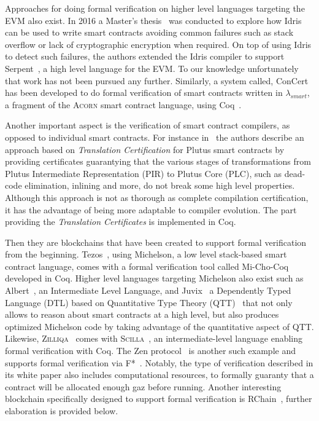 \documentclass[]{report}
\begin{document}
Approaches for doing formal verification on higher level languages
targeting the EVM also exist.  In 2016 a Master's
thesis~\cite{Pettersson2016} was conducted to explore how Idris can be
used to write smart contracts avoiding common failures such as stack
overflow or lack of cryptographic encryption when required.  On top of
using Idris to detect such failures, the authors extended the Idris
compiler to support Serpent~\cite{Delmolino2015}, a high level
language for the EVM.  To our knowledge unfortunately that work has
not been pursued any further.  Similarly, a system called,
ConCert~\cite{Annenkov2020} has been developed to do formal
verification of smart contracts written in $\lambda_{smart}$, a
fragment of the \textsc{Acorn} smart contract language, using
Coq~\cite{Bertot2004}.

Another important aspect is the verification of smart contract
compilers, as opposed to individual smart contracts.  For instance
in~\cite{Krijnen2022} the authors describe an approach based on
\emph{Translation Certification} for Plutus smart contracts by
providing certificates guarantying that the various stages of
transformations from Plutus Intermediate Representation (PIR) to
Plutus Core (PLC), such as dead-code elimination, inlining and more,
do not break some high level properties.  Although this approach is
not as thorough as complete compilation certification, it has the
advantage of being more adaptable to compiler evolution.  The part
providing the \emph{Translation Certificates} is implemented in Coq.

Then they are blockchains that have been created to support formal
verification from the beginning.  Tezos~\cite{Tezos2014}, using
Michelson, a low level stack-based smart contract language, comes with
a formal verification tool called Mi-Cho-Coq~\cite{Bernardo2019}
developed in Coq.  Higher level languages targeting Michelson also
exist such as Albert~\cite{Bernardo2020}, an Intermediate Level
Language, and Juvix~\cite{Goes2020} a Dependently Typed Language (DTL)
based on Quantitative Type Theory (QTT)~\cite{Atkey2018} that not only
allows to reason about smart contracts at a high level, but also
produces optimized Michelson code by taking advantage of the
quantitative aspect of QTT.  Likewise,
\textsc{Zilliqa}~\cite{Zilliqa2017} comes with
\textsc{Scilla}~\cite{Ilya2018}, an intermediate-level language
enabling formal verification with Coq.  The Zen
protocol~\cite{Zen2017} is another such example and supports formal
verification via F*~\cite{Swamy2013}.  Notably, the type of
verification described in its white paper also includes computational
resources, to formally guaranty that a contract will be allocated
enough gaz before running.  Another interesting blockchain
specifically designed to support formal verification is
RChain~\cite{RChain2021}, further elaboration is provided below.
\end{document}
